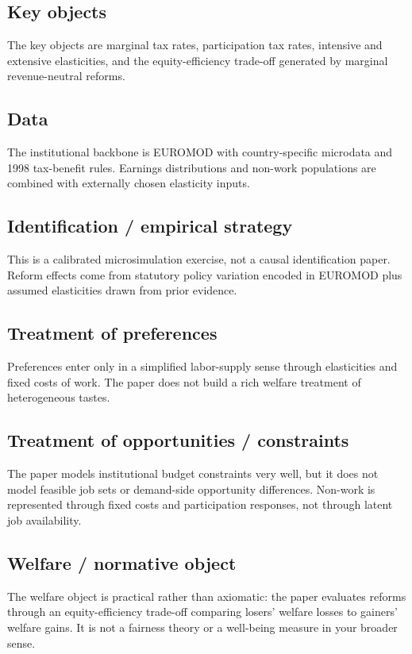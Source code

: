 \documentclass[11pt,a4paper]{article}
\begin{document}
\subsection*{Key objects}
The key objects are marginal tax rates, participation tax rates, intensive and extensive elasticities, and the equity-efficiency trade-off generated by marginal revenue-neutral reforms.

\subsection*{Data}
The institutional backbone is EUROMOD with country-specific microdata and 1998 tax-benefit rules. Earnings distributions and non-work populations are combined with externally chosen elasticity inputs.

\subsection*{Identification / empirical strategy}
This is a calibrated microsimulation exercise, not a causal identification paper. Reform effects come from statutory policy variation encoded in EUROMOD plus assumed elasticities drawn from prior evidence.

\subsection*{Treatment of preferences}
Preferences enter only in a simplified labor-supply sense through elasticities and fixed costs of work. The paper does not build a rich welfare treatment of heterogeneous tastes.

\subsection*{Treatment of opportunities / constraints}
The paper models institutional budget constraints very well, but it does not model feasible job sets or demand-side opportunity differences. Non-work is represented through fixed costs and participation responses, not through latent job availability.

\subsection*{Welfare / normative object}
The welfare object is practical rather than axiomatic: the paper evaluates reforms through an equity-efficiency trade-off comparing losers’ welfare losses to gainers’ welfare gains. It is not a fairness theory or a well-being measure in your broader sense.
\end{document}
